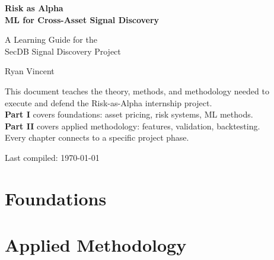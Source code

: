 \documentclass[11pt,a4paper]{report}
\begin{document}
\begin{titlepage}
\centering
\vspace*{3cm}
{\Huge\bfseries Risk as Alpha\\[0.4cm]
ML for Cross-Asset Signal Discovery\par}
\vspace{1.5cm}
{\Large A Learning Guide for the\\[0.3cm]
SecDB Signal Discovery Project\par}
\vspace{1cm}
{\Large Ryan Vincent\par}
\vspace{1.5cm}
{\normalsize
This document teaches the theory, methods, and methodology needed to\\
execute and defend the Risk-as-Alpha internship project.\\[0.5cm]
\textbf{Part I} covers foundations: asset pricing, risk systems, ML methods.\\
\textbf{Part II} covers applied methodology: features, validation, backtesting.\\[0.5cm]
Every chapter connects to a specific project phase.\par}
\vfill
{\small Last compiled: \today\par}
\end{titlepage}

\tableofcontents
\newpage


\part{Foundations}











\part{Applied Methodology}







\end{document}
